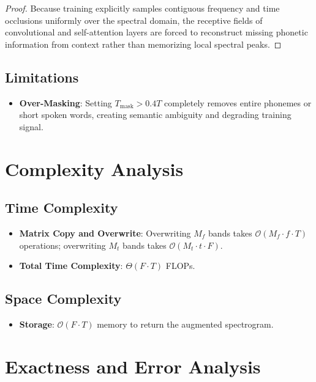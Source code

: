 \documentclass[11pt,a4paper]{article}
\theoremstyle{definition}
\begin{document}
\begin{proof}
Because training explicitly samples contiguous frequency and time occlusions uniformly over the spectral domain, the receptive fields of convolutional and self-attention layers are forced to reconstruct missing phonetic information from context rather than memorizing local spectral peaks.
\end{proof}

\subsection{Limitations}
\begin{itemize}
    \item \textbf{Over-Masking}: Setting $T_{\text{mask}} > 0.4 T$ completely removes entire phonemes or short spoken words, creating semantic ambiguity and degrading training signal.
\end{itemize}

\section{Complexity Analysis}

\subsection{Time Complexity}
\begin{itemize}
    \item \textbf{Matrix Copy and Overwrite}: Overwriting $M_f$ bands takes $\mathcal{O}(M_f \cdot f \cdot T)$ operations; overwriting $M_t$ bands takes $\mathcal{O}(M_t \cdot t \cdot F)$.
    \item \textbf{Total Time Complexity}: $\Theta(F \cdot T)$ FLOPs.
\end{itemize}

\subsection{Space Complexity}
\begin{itemize}
    \item \textbf{Storage}: $\mathcal{O}(F \cdot T)$ memory to return the augmented spectrogram.
\end{itemize}

\section{Exactness and Error Analysis}
\end{document}
